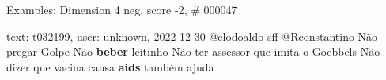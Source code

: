 \begin{frame}{Examples: Dimension 4 neg, score -2, \# 000047}
\footnotesize
\begin{alertblock}{text: t032199, user: unknown, 2022-12-30}
@clodoaldo-sff @Rconstantino Não pregar Golpe Não \textbf{beber} leitinho Não 
ter assessor que imita o Goebbels Não dizer que vacina causa \textbf{aids} 
também ajuda 
\end{alertblock}
\end{frame}
